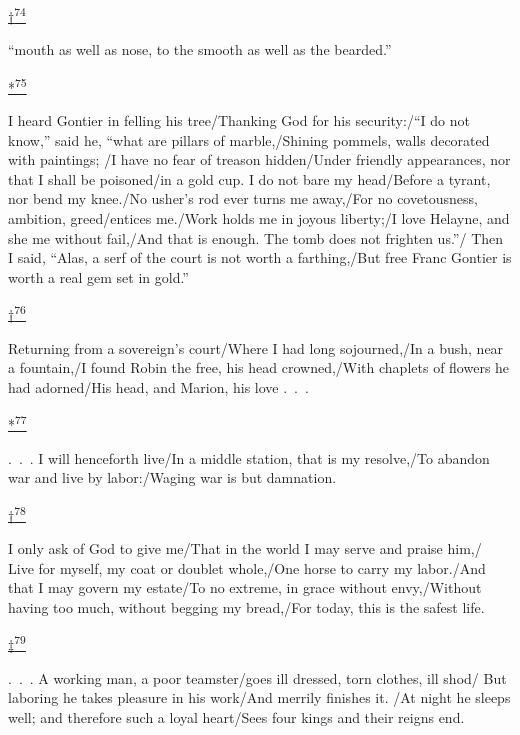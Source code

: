\protect\hypertarget{23_NOTES.xhtmlux5cux23id_3088}{\protect\hyperlink{10_Chapter_Three__THE_HEROIC_DREAM.xhtmlux5cux23id_3087}{†\textsuperscript{74}}}
``mouth as well as nose, to the smooth as well as the bearded.''

\protect\hypertarget{23_NOTES.xhtmlux5cux23id_3090}{\protect\hyperlink{10_Chapter_Three__THE_HEROIC_DREAM.xhtmlux5cux23id_3089}{*\textsuperscript{75}}}
I heard Gontier in felling his tree/Thanking God for his security:/``I
do not know,'' said he, ``what are pillars of marble,/Shining pommels,
walls decorated with paintings; /I have no fear of treason hidden/Under
friendly appearances, nor that I shall be poisoned/in a gold cup. I do
not bare my head/Before a tyrant, nor bend my knee./No usher's rod ever
turns me away,/For no covetousness, ambition, greed/entices me./Work
holds me in joyous liberty;/I love Helayne, and she me without fail,/And
that is enough. The tomb does not frighten us.''/ Then I said, ``Alas, a
serf of the court is not worth a farthing,/But free Franc Gontier is
worth a real gem set in gold.''

\protect\hypertarget{23_NOTES.xhtmlux5cux23id_3092}{\protect\hyperlink{10_Chapter_Three__THE_HEROIC_DREAM.xhtmlux5cux23id_3091}{†\textsuperscript{76}}}
Returning from a sovereign's court/Where I had long sojourned,/In a
bush, near a fountain,/I found Robin the free, his head crowned,/With
chaplets of flowers he had adorned/His head, and Marion, his love .~.~.

\protect\hypertarget{23_NOTES.xhtmlux5cux23id_3094}{\protect\hyperlink{10_Chapter_Three__THE_HEROIC_DREAM.xhtmlux5cux23id_3093}{*\textsuperscript{77}}}
.~.~. I will henceforth live/In a middle station, that is my resolve,/To
abandon war and live by labor:/Waging war is but damnation.

\protect\hypertarget{23_NOTES.xhtmlux5cux23id_3096}{\protect\hyperlink{10_Chapter_Three__THE_HEROIC_DREAM.xhtmlux5cux23id_3095}{†\textsuperscript{78}}}
I only ask of God to give me/That in the world I may serve and praise
him,/ Live for myself, my coat or doublet whole,/One horse to carry my
labor./And that I may govern my estate/To no extreme, in grace without
envy,/Without having too much, without begging my bread,/For today, this
is the safest life.

\protect\hypertarget{23_NOTES.xhtmlux5cux23id_3098}{\protect\hyperlink{10_Chapter_Three__THE_HEROIC_DREAM.xhtmlux5cux23id_3097}{‡\textsuperscript{79}}}
.~.~. A working man, a poor teamster/goes ill dressed, torn clothes, ill
shod/ But laboring he takes pleasure in his work/And merrily finishes
it. /At night he sleeps well; and therefore such a loyal heart/Sees four
kings and their reigns end.

